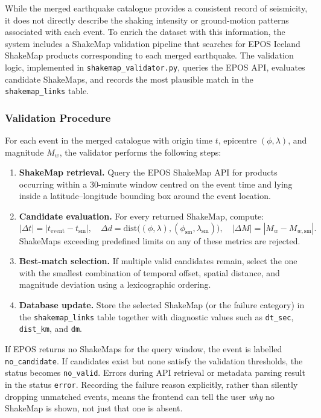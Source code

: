 \documentclass[12pt]{article}
\begin{document}
While the merged earthquake catalogue provides a consistent record of seismicity, it does not directly describe the shaking intensity or ground-motion patterns associated with each event. To enrich the dataset with this information, the system includes a ShakeMap validation pipeline that searches for EPOS Iceland ShakeMap products corresponding to each merged earthquake. The validation logic, implemented in \texttt{shakemap\_validator.py}, queries the EPOS API, evaluates candidate ShakeMaps, and records the most plausible match in the \texttt{shakemap\_links} table.

\subsubsection*{Validation Procedure}

For each event in the merged catalogue with origin time $t$, epicentre $(\phi, \lambda)$, and magnitude $M_w$, the validator performs the following steps:

\begin{enumerate}
    \item \textbf{ShakeMap retrieval.} Query the EPOS ShakeMap API for products occurring within a 30-minute window centred on the event time and lying inside a latitude--longitude bounding box around the event location.
    \item \textbf{Candidate evaluation.} For every returned ShakeMap, compute:
    \[
    |\Delta t| = |t_{\text{event}} - t_{\text{sm}}|, \quad 
    \Delta d = \text{dist}\big((\phi,\lambda), (\phi_{\text{sm}},\lambda_{\text{sm}})\big), \quad
    |\Delta M| = |M_w - M_{w,\text{sm}}|.
    \]
    ShakeMaps exceeding predefined limits on any of these metrics are rejected.
    \item \textbf{Best-match selection.} If multiple valid candidates remain, select the one with the smallest combination of temporal offset, spatial distance, and magnitude deviation using a lexicographic ordering.
    \item \textbf{Database update.} Store the selected ShakeMap (or the failure category) in the \texttt{shakemap\_links} table together with diagnostic values such as \texttt{dt\_sec}, \texttt{dist\_km}, and \texttt{dm}.
\end{enumerate}

If EPOS returns no ShakeMaps for the query window, the event is labelled \texttt{no\_candidate}. If candidates exist but none satisfy the validation thresholds, the status becomes \texttt{no\_valid}. Errors during API retrieval or metadata parsing result in the status \texttt{error}. Recording the failure reason explicitly, rather than silently dropping unmatched events, means the frontend can tell the user \emph{why} no ShakeMap is shown, not just that one is absent.
\end{document}
